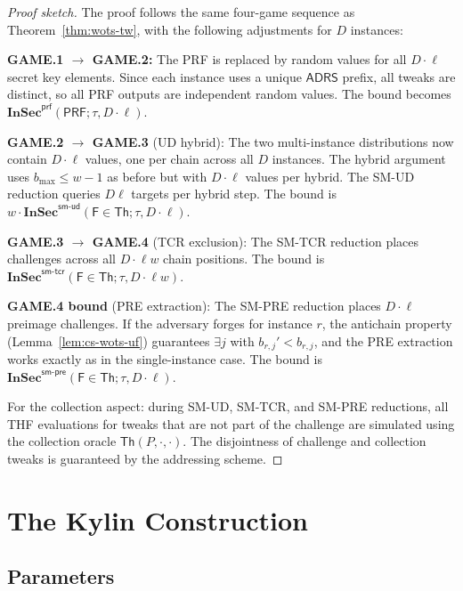 \documentclass[11pt,a4paper]{article}
\newcommand{\F}{\mathsf{F}}
\newcommand{\Th}{\mathsf{Th}}
\newcommand{\ADRS}{\mathsf{ADRS}}
\newcommand{\PRF}{\mathsf{PRF}}
\newcommand{\InSec}[1]{\mathbf{InSec}^{\mathsf{#1}}}
\begin{document}
\begin{proof}[Proof sketch]
The proof follows the same four-game sequence as Theorem~\ref{thm:wots-tw}, with the following adjustments for $D$ instances:

\textbf{GAME.1 $\to$ GAME.2:} The PRF is replaced by random values for all $D \cdot \ell$ secret key elements. Since each instance uses a unique $\ADRS$ prefix, all tweaks are distinct, so all PRF outputs are independent random values. The bound becomes $\InSec{prf}(\PRF; \tau, D\!\cdot\!\ell)$.

\textbf{GAME.2 $\to$ GAME.3} (UD hybrid): The two multi-instance distributions now contain $D \cdot \ell$ values, one per chain across all $D$ instances. The hybrid argument uses $b_{\max} \le w-1$ as before but with $D \cdot \ell$ values per hybrid. The SM-UD reduction queries $D\ell$ targets per hybrid step. The bound is $w \cdot \InSec{sm\text{-}ud}(\F \in \boldsymbol{\Th}; \tau, D\!\cdot\!\ell)$.

\textbf{GAME.3 $\to$ GAME.4} (TCR exclusion): The SM-TCR reduction places challenges across all $D \cdot \ell w$ chain positions. The bound is $\InSec{sm\text{-}tcr}(\F \in \boldsymbol{\Th}; \tau, D\!\cdot\!\ell w)$.

\textbf{GAME.4 bound} (PRE extraction): The SM-PRE reduction places $D\!\cdot\!\ell$ preimage challenges. If the adversary forges for instance $r$, the antichain property (Lemma~\ref{lem:cs-wots-uf}) guarantees $\exists j$ with $b_{r,j}' < b_{r,j}$, and the PRE extraction works exactly as in the single-instance case. The bound is $\InSec{sm\text{-}pre}(\F \in \boldsymbol{\Th}; \tau, D\!\cdot\!\ell)$.

For the collection aspect: during SM-UD, SM-TCR, and SM-PRE reductions, all THF evaluations for tweaks that are not part of the challenge are simulated using the collection oracle $\boldsymbol{\Th}(P,\cdot,\cdot)$. The disjointness of challenge and collection tweaks is guaranteed by the addressing scheme.
\end{proof}

\section{The Kylin Construction}
\label{sec:kylin-construction}

\subsection{Parameters}
\end{document}
